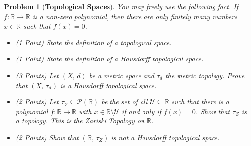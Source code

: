 \documentclass{article}
\theoremstyle{normal}
\newtheorem{problem}{Problem}
\begin{document}
    \clearpage
    \color{blue}
    \begin{problem}[\textbf{Topological Spaces}]
        \par\hfill\par\vspace{1em}
        You may freely use the following fact. If
        $f:\mathbb{R}\rightarrow\mathbb{R}$ is a non-zero polynomial, then
        there are only finitely many numbers $x\in\mathbb{R}$ such that
        $f(x)=0$.
        \begin{itemize}
            \item (1 Point) State the definition of a topological space.
            \item (1 Point) State the definition of a
                Hausdorff topological space.
            \item (3 Points) Let $(X,\,d)$ be a metric space and $\tau_{d}$ the
                metric topology. Prove that $(X,\,\tau_{d})$ is a Hausdorff
                topological space.
            \item (2 Points) Let $\tau_{Z}\subseteq\mathcal{P}(\mathbb{R})$ be
                the set of all $\mathcal{U}\subseteq\mathbb{R}$ such that
                there is a polynomial $f:\mathbb{R}\rightarrow\mathbb{R}$
                with $x\in\mathbb{R}\setminus\mathcal{U}$ if and only if
                $f(x)=0$. Show that $\tau_{Z}$ is a topology. This is the
                \textit{Zariski Topology} on $\mathbb{R}$.
            \item (2 Points) Show that $(\mathbb{R},\,\tau_{Z})$ is not
                a Hausdorff topological space.
        \end{itemize}
    \end{problem}
    \color{black}
\end{document}
